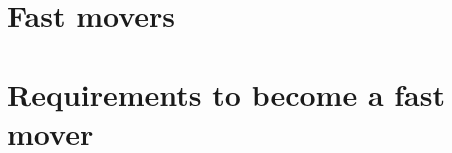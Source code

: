 \documentclass[a4]{scrartcl}
\begin{document}
	
	
	
	\section{Fast movers}
	
	
	
	
	\section{Requirements to become a fast mover}
	
	
	
	\cite{digitalmatrix}
	\cite{leadingdigital}
	\cite{wiwi}
	
	
	
	
	
	\printbibliography
	
	
	
	
	
	
\end{document}
